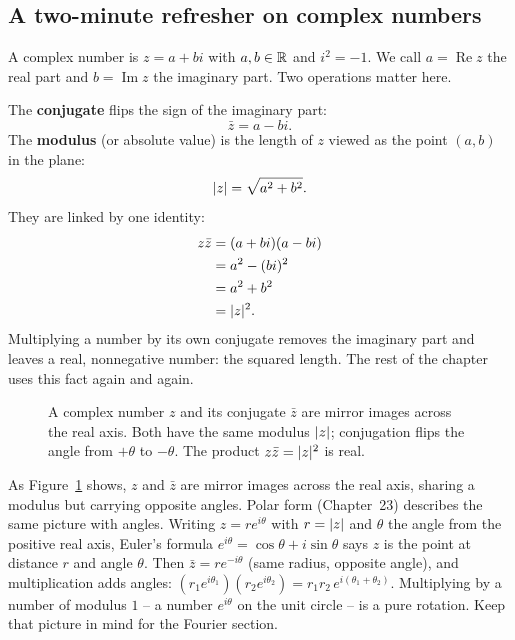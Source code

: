 \subsection{A two-minute refresher on complex numbers}

A complex
number is $z = a + bi$ with $a,b\in\mathbb{R}$ and $i^2=-1$. We call $a=\operatorname{Re}z$
the real part and $b=\operatorname{Im}z$ the imaginary part. Two operations matter
here.

The \textbf{conjugate} flips the sign of the imaginary part:
\[
  \bar z = a - bi.
\]
The \textbf{modulus} (or absolute value) is the length of $z$ viewed as the point
$(a,b)$ in the plane:
\[
  \lvert z\rvert = \sqrt{a^2+b^2}.
\]
They are linked by one identity:
\begin{align*}
  z\bar z &= (a+bi)(a-bi) \\
  &= a^2 - (bi)^2 \\
  &= a^2 + b^2 \\
  &= \lvert z\rvert^2.
\end{align*}
Multiplying a number by its own conjugate removes the imaginary part and
leaves a real, nonnegative number: the squared length. The rest of the chapter
uses this fact again and again.

\begin{figure}[htbp]
\centering
{}
\caption{A complex number $z$ and its conjugate $\bar z$ are mirror images across
the real axis. Both have the same modulus $\lvert z\rvert$; conjugation flips the angle
from $+\theta$ to $-\theta$. The product $z\bar z=\lvert z\rvert^2$ is real.}
\label{ch32:conjugate}
\end{figure}

As Figure~\ref{ch32:conjugate} shows, $z$ and $\bar z$ are mirror images
across the real axis, sharing a modulus but carrying opposite angles.
Polar form (Chapter~23) describes the same picture with angles. Writing
$z = r e^{i\theta}$ with $r=\lvert z\rvert$ and $\theta$ the angle from the positive real
axis, Euler's formula $e^{i\theta}=\cos\theta + i\sin\theta$ says $z$ is the point
at distance $r$ and angle $\theta$. Then
$\bar z = r e^{-i\theta}$ (same radius, opposite angle), and multiplication adds
angles: $(r_1e^{i\theta_1})(r_2e^{i\theta_2}) = r_1r_2\,e^{i(\theta_1+\theta_2)}$.
Multiplying by a number of modulus $1$ -- a number $e^{i\theta}$ on the unit
circle -- is a pure rotation. Keep that picture in mind for the Fourier section.

